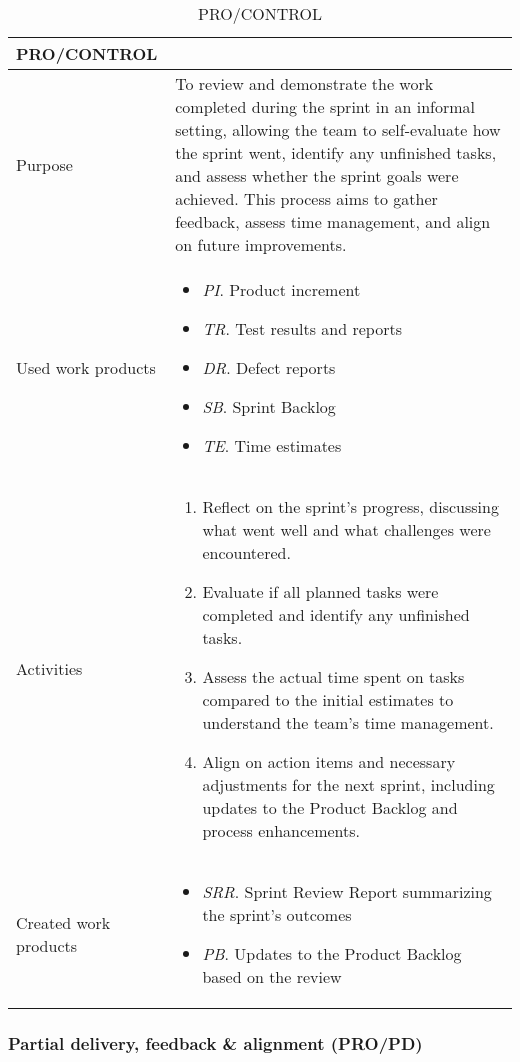 \begin{table}[h!]
\begin{tabular}{l|p{}}
\hline
\textbf{PRO/CONTROL}        & \textbf{} \\ \hline
Purpose & To review and demonstrate the work completed during the sprint in an informal setting, allowing the team to self-evaluate how the sprint went, identify any unfinished tasks, and assess whether the sprint goals were achieved. This process aims to gather feedback, assess time management, and align on future improvements. \\ \hline
Used work products    &      
\begin{itemize}
    \item \textit{PI}. Product increment
    \item \textit{TR}. Test results and reports
    \item \textit{DR}. Defect reports
    \item \textit{SB}. Sprint Backlog
    \item \textit{TE}. Time estimates
\end{itemize}
\\ \hline
Activities            &   
\begin{enumerate}
    \item Reflect on the sprint's progress, discussing what went well and what challenges were encountered.
    \item Evaluate if all planned tasks were completed and identify any unfinished tasks.
    \item Assess the actual time spent on tasks compared to the initial estimates to understand the team's time management.
    \item Align on action items and necessary adjustments for the next sprint, including updates to the Product Backlog and process enhancements.
\end{enumerate}
\\ \hline
Created work products &     
\begin{itemize}
    \item \textit{SRR}. Sprint Review Report summarizing the sprint's outcomes 
    \item \textit{PB}. Updates to the Product Backlog based on the review
\end{itemize}
\end{tabular}
\caption{PRO/CONTROL}
\label{control_process}
\end{table}

\newpage
\subsubsection{Partial delivery, feedback \& alignment (PRO/PD)}

